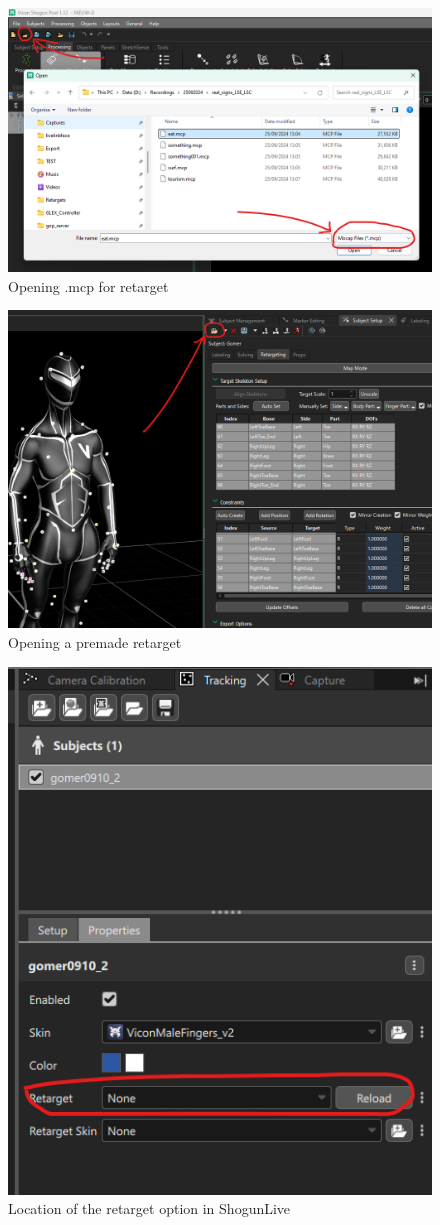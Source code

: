 \documentclass{uva-inf-article}
\begin{document}
\begin{figure}
    \centering
    \includegraphics[height=0.6\textwidth]{imgs/openmcp.png}
    \caption{Opening .mcp for retarget}
    \label{fig:mcp}
\end{figure}
\begin{figure}
    \centering
    \includegraphics[height=0.6\textwidth]{imgs/subjectsetupretarget.png}
    \caption{Opening a premade retarget}
    \label{fig:premadeRetarget}
\end{figure}
\begin{figure}
    \centering
    \includegraphics[height=0.6\textwidth]{imgs/retargetLive.png}
    \caption{Location of the retarget option in ShogunLive}
    \label{fig:shogunLiveRetargetOption}
\end{figure}
\end{document}
